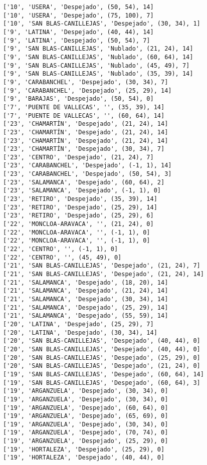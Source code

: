 \documentclass[11pt]{article}
\begin{document}
\begin{Verbatim}[commandchars=\\\{\}]
['10', 'USERA', 'Despejado', (50, 54), 14]
['10', 'USERA', 'Despejado', (75, 100), 7]
['10', 'SAN BLAS-CANILLEJAS', 'Despejado', (30, 34), 1]
['9', 'LATINA', 'Despejado', (40, 44), 14]
['9', 'LATINA', 'Despejado', (50, 54), 7]
['9', 'SAN BLAS-CANILLEJAS', 'Nublado', (21, 24), 14]
['9', 'SAN BLAS-CANILLEJAS', 'Nublado', (60, 64), 14]
['9', 'SAN BLAS-CANILLEJAS', 'Nublado', (45, 49), 7]
['9', 'SAN BLAS-CANILLEJAS', 'Nublado', (35, 39), 14]
['9', 'CARABANCHEL', 'Despejado', (30, 34), 7]
['9', 'CARABANCHEL', 'Despejado', (25, 29), 14]
['9', 'BARAJAS', 'Despejado', (50, 54), 0]
['7', 'PUENTE DE VALLECAS', '', (35, 39), 14]
['7', 'PUENTE DE VALLECAS', '', (60, 64), 14]
['23', 'CHAMARTÍN', 'Despejado', (21, 24), 14]
['23', 'CHAMARTÍN', 'Despejado', (21, 24), 14]
['23', 'CHAMARTÍN', 'Despejado', (21, 24), 14]
['23', 'CHAMARTÍN', 'Despejado', (30, 34), 7]
['23', 'CENTRO', 'Despejado', (21, 24), 7]
['23', 'CARABANCHEL', 'Despejado', (-1, 1), 14]
['23', 'CARABANCHEL', 'Despejado', (50, 54), 3]
['23', 'SALAMANCA', 'Despejado', (60, 64), 2]
['23', 'SALAMANCA', 'Despejado', (-1, 1), 0]
['23', 'RETIRO', 'Despejado', (35, 39), 14]
['23', 'RETIRO', 'Despejado', (25, 29), 14]
['23', 'RETIRO', 'Despejado', (25, 29), 6]
['22', 'MONCLOA-ARAVACA', '', (21, 24), 0]
['22', 'MONCLOA-ARAVACA', '', (-1, 1), 0]
['22', 'MONCLOA-ARAVACA', '', (-1, 1), 0]
['22', 'CENTRO', '', (-1, 1), 0]
['22', 'CENTRO', '', (45, 49), 0]
['21', 'SAN BLAS-CANILLEJAS', 'Despejado', (21, 24), 7]
['21', 'SAN BLAS-CANILLEJAS', 'Despejado', (21, 24), 14]
['21', 'SALAMANCA', 'Despejado', (18, 20), 14]
['21', 'SALAMANCA', 'Despejado', (21, 24), 14]
['21', 'SALAMANCA', 'Despejado', (30, 34), 14]
['21', 'SALAMANCA', 'Despejado', (25, 29), 14]
['21', 'SALAMANCA', 'Despejado', (55, 59), 14]
['20', 'LATINA', 'Despejado', (25, 29), 7]
['20', 'LATINA', 'Despejado', (30, 34), 14]
['20', 'SAN BLAS-CANILLEJAS', 'Despejado', (40, 44), 0]
['20', 'SAN BLAS-CANILLEJAS', 'Despejado', (40, 44), 0]
['20', 'SAN BLAS-CANILLEJAS', 'Despejado', (25, 29), 0]
['20', 'SAN BLAS-CANILLEJAS', 'Despejado', (21, 24), 0]
['19', 'SAN BLAS-CANILLEJAS', 'Despejado', (60, 64), 14]
['19', 'SAN BLAS-CANILLEJAS', 'Despejado', (60, 64), 3]
['19', 'ARGANZUELA', 'Despejado', (30, 34), 0]
['19', 'ARGANZUELA', 'Despejado', (30, 34), 0]
['19', 'ARGANZUELA', 'Despejado', (60, 64), 0]
['19', 'ARGANZUELA', 'Despejado', (65, 69), 0]
['19', 'ARGANZUELA', 'Despejado', (30, 34), 0]
['19', 'ARGANZUELA', 'Despejado', (70, 74), 0]
['19', 'ARGANZUELA', 'Despejado', (25, 29), 0]
['19', 'HORTALEZA', 'Despejado', (25, 29), 0]
['19', 'HORTALEZA', 'Despejado', (40, 44), 0]

\end{Verbatim}
\end{document}
